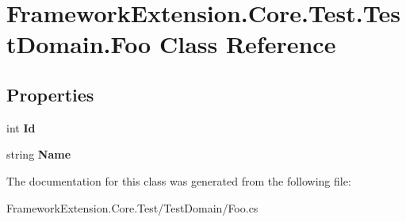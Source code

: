 \hypertarget{class_framework_extension_1_1_core_1_1_test_1_1_test_domain_1_1_foo}{\section{Framework\-Extension.\-Core.\-Test.\-Test\-Domain.\-Foo Class Reference}
\label{class_framework_extension_1_1_core_1_1_test_1_1_test_domain_1_1_foo}
}
\subsection*{Properties}
\begin{DoxyCompactItemize}
\item 
\hypertarget{class_framework_extension_1_1_core_1_1_test_1_1_test_domain_1_1_foo_adbda4bf8d3a7ed8e9c4f5db100f367b0}{int {\bfseries Id}}\label{class_framework_extension_1_1_core_1_1_test_1_1_test_domain_1_1_foo_adbda4bf8d3a7ed8e9c4f5db100f367b0}

\item 
\hypertarget{class_framework_extension_1_1_core_1_1_test_1_1_test_domain_1_1_foo_a1b045c518e71d4ee187ab16c31230a81}{string {\bfseries Name}}\label{class_framework_extension_1_1_core_1_1_test_1_1_test_domain_1_1_foo_a1b045c518e71d4ee187ab16c31230a81}

\end{DoxyCompactItemize}


The documentation for this class was generated from the following file\-:\begin{DoxyCompactItemize}
\item 
Framework\-Extension.\-Core.\-Test/\-Test\-Domain/Foo.\-cs\end{DoxyCompactItemize}

